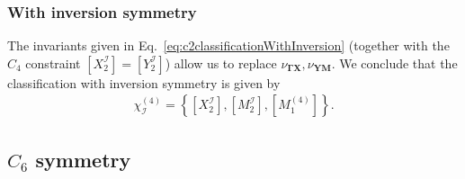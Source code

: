 \subsubsection*{With inversion symmetry} 
The invariants given in Eq.~\eqref{eq:c2classificationWithInversion} (together with the $C_4$ constraint $[X^\mathcal{I}_2] = [Y^\mathcal{I}_2]$) allow us to replace $\nu_{\mathbf{\Gamma X}}, \nu_{\mathbf{Y M}}$. We conclude that the classification with inversion symmetry is given by
\begin{equation} 
\begin{aligned}
\chi^{(4)}_\mathcal{I}=\left\{[X^\mathcal{I}_2],[M^\mathcal{I}_2], [M_1^{(4)}]\right\}.
\end{aligned} 
\end{equation}

\subsection{$C_6$ symmetry}
